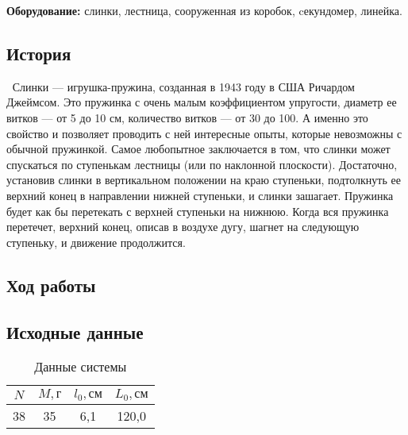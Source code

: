 \documentclass[a4paper, 12pt]{article}
\begin{document}
\bigskip

\noindent \textbf{Оборудование:} слинки, лестница, сооруженная из коробок, cекундомер, линейка.
\bigskip


\begin{center}
\subsection*{История}
\end{center}

$\>$ Слинки — игрушка-пружина, созданная в 1943 году в США Ричардом Джеймсом. 
Это пружинка с очень малым коэффициентом упругости, диаметр ее витков — от 5 до 10 см, количество витков — от 30 до 100.
А именно это свойство и позволяет проводить с ней интересные опыты, которые невозможны с обычной пружинкой. Самое любопытное заключается в том, что слинки может спускаться по ступенькам лестницы (или по наклонной плоскости). Достаточно, установив слинки в вертикальном положении на краю ступеньки, подтолкнуть ее верхний конец в направлении нижней ступеньки, и слинки зашагает. Пружинка будет как бы перетекать с верхней ступеньки на нижнюю. Когда вся пружинка перетечет, верхний конец, описав в воздухе дугу, шагнет на следующую ступеньку, и движение продолжится. 

\begin{center}
\section*{Ход работы}
\end{center}

\begin{center}    
\subsection*{Исходные данные}
\end{center}

\begin{table}[h]
    \begin{center}
    \begin{tabular}{|c|c|c|c|}
        \hline \hline
        $ N $ & $ M, \text{г} $ & $ l_{0}, \text{см} $ & $ L_{0}, \text{см}$ \\
        \hline
        38 & 35 & 6,1 & 120,0 \\
        \hline \hline
    \end{tabular}
    \caption{Данные системы}
    \end{center}
\end{table}
\end{document}

